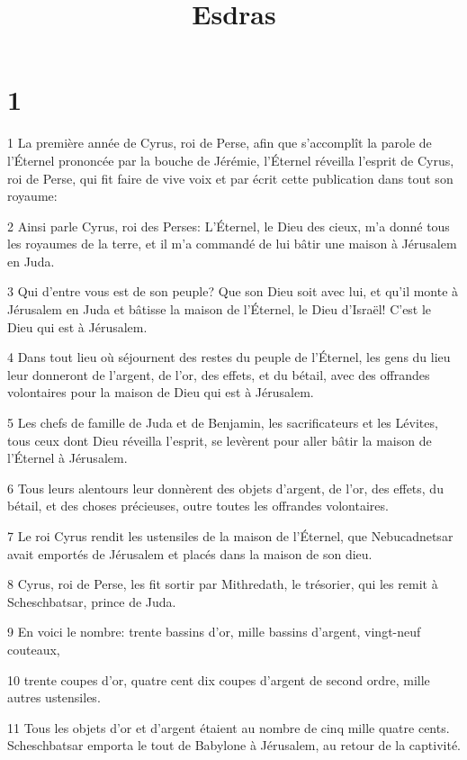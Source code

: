 

\title{Esdras}


\chapter{1}

\par 1 La première année de Cyrus, roi de Perse, afin que s'accomplît la parole de l'Éternel prononcée par la bouche de Jérémie, l'Éternel réveilla l'esprit de Cyrus, roi de Perse, qui fit faire de vive voix et par écrit cette publication dans tout son royaume:
\par 2 Ainsi parle Cyrus, roi des Perses: L'Éternel, le Dieu des cieux, m'a donné tous les royaumes de la terre, et il m'a commandé de lui bâtir une maison à Jérusalem en Juda.
\par 3 Qui d'entre vous est de son peuple? Que son Dieu soit avec lui, et qu'il monte à Jérusalem en Juda et bâtisse la maison de l'Éternel, le Dieu d'Israël! C'est le Dieu qui est à Jérusalem.
\par 4 Dans tout lieu où séjournent des restes du peuple de l'Éternel, les gens du lieu leur donneront de l'argent, de l'or, des effets, et du bétail, avec des offrandes volontaires pour la maison de Dieu qui est à Jérusalem.
\par 5 Les chefs de famille de Juda et de Benjamin, les sacrificateurs et les Lévites, tous ceux dont Dieu réveilla l'esprit, se levèrent pour aller bâtir la maison de l'Éternel à Jérusalem.
\par 6 Tous leurs alentours leur donnèrent des objets d'argent, de l'or, des effets, du bétail, et des choses précieuses, outre toutes les offrandes volontaires.
\par 7 Le roi Cyrus rendit les ustensiles de la maison de l'Éternel, que Nebucadnetsar avait emportés de Jérusalem et placés dans la maison de son dieu.
\par 8 Cyrus, roi de Perse, les fit sortir par Mithredath, le trésorier, qui les remit à Scheschbatsar, prince de Juda.
\par 9 En voici le nombre: trente bassins d'or, mille bassins d'argent, vingt-neuf couteaux,
\par 10 trente coupes d'or, quatre cent dix coupes d'argent de second ordre, mille autres ustensiles.
\par 11 Tous les objets d'or et d'argent étaient au nombre de cinq mille quatre cents. Scheschbatsar emporta le tout de Babylone à Jérusalem, au retour de la captivité.

